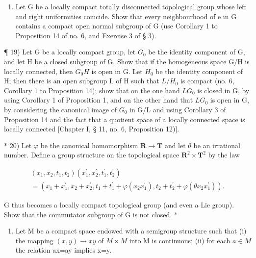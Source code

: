 \begin{enumerate}
\def\labelenumi{\arabic{enumi})}
\setcounter{enumi}{17}
\tightlist
\item
  Let G be a locally compact totally disconnected topological group whose left and right uniformities coincide. Show that every neighbourhood of e in G contains a compact open normal subgroup of G (use Corollary 1 to Proposition 14 of no. 6, and Exercise 3 of § 3).
\end{enumerate}

¶ 19) Let G be a locally compact group, let \(G_{0}\) be the identity component of G, and let H be a closed subgroup of G. Show that if the homogeneous space G/H is locally connected, then \(G_{0}H\) is open in G. Let \(H_{0}\) be the identity component of H; then there is an open subgroup L of H such that \(L/H_{0}\) is compact (no. 6, Corollary 1 to Proposition 14); show that on the one hand \(LG_{0}\) is closed in G, by using Corollary 1 of Proposition 1, and on the other hand that \(LG_{0}\) is open in G, by considering the canonical image of \(G_{0}\) in G/L and using Corollary 3 of Proposition 14 and the fact that a quotient space of a locally connected space is locally connected {[}Chapter I, § 11, no. 6, Proposition 12){]}.

* 20) Let \(\varphi\) be the canonical homomorphism \(\mathbf{R} \to \mathbf{T}\) and let \(\theta\) be an irrational number. Define a group structure on the topological space \(\mathbf{R}^2 \times \mathbf{T}^2\) by the law

\[
\begin{array}{l} \left(x _ {1}, x _ {2}, t _ {1}, t _ {2}\right) \left(x _ {1} ^ {\prime}, x _ {2} ^ {\prime}, t _ {1} ^ {\prime}, t _ {2} ^ {\prime}\right) \\ = \left(x _ {1} + x _ {1} ^ {\prime}, x _ {2} + x _ {2} ^ {\prime}, t _ {1} + t _ {1} ^ {\prime} + \varphi \left(x _ {2} x _ {1} ^ {\prime}\right), t _ {2} + t _ {2} ^ {\prime} + \varphi \left(\theta x _ {2} x _ {1} ^ {\prime}\right)\right). \end{array}
\]

G thus becomes a locally compact topological group (and even a Lie group). Show that the commutator subgroup of G is not closed. *

\begin{enumerate}
\def\labelenumi{\arabic{enumi})}
\setcounter{enumi}{20}
\tightlist
\item
  Let M be a compact space endowed with a semigroup structure such that (i) the mapping \((x,y)\to xy\) of \(M\times M\) into M is continuous; (ii) for each \(a\in M\) the relation ax=ay implies x=y.
\end{enumerate}

